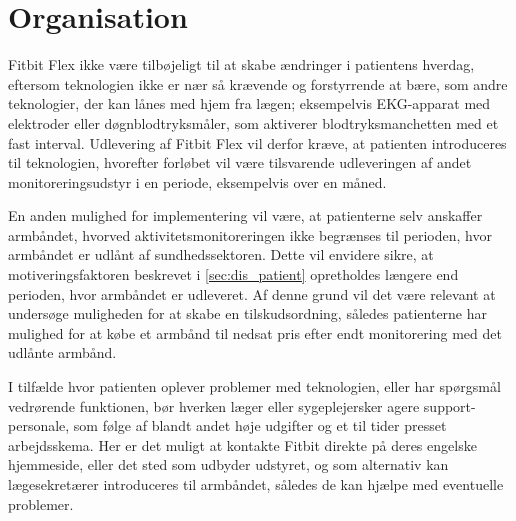 \section{Organisation} \label{sec:dis_organisation}

Fitbit Flex ikke være tilbøjeligt til at skabe ændringer i patientens hverdag, eftersom teknologien ikke er nær så krævende og forstyrrende at bære, som andre teknologier, der kan lånes med hjem fra lægen; eksempelvis EKG-apparat med elektroder eller døgnblodtryksmåler, som aktiverer blodtryksmanchetten med et fast interval. Udlevering af Fitbit Flex vil derfor kræve, at patienten introduceres til teknologien, hvorefter forløbet vil være tilsvarende udleveringen af andet monitoreringsudstyr i en periode, eksempelvis over en måned.

En anden mulighed for implementering vil være, at patienterne selv anskaffer armbåndet, hvorved aktivitetsmonitoreringen ikke begrænses til perioden, hvor armbåndet er udlånt af sundhedssektoren. Dette vil envidere sikre, at motiveringsfaktoren beskrevet i \autoref{sec:dis_patient} opretholdes længere end perioden, hvor armbåndet er udleveret. Af denne grund vil det være relevant at undersøge muligheden for at skabe en tilskudsordning, således patienterne har mulighed for at købe et armbånd til nedsat pris efter endt monitorering med det udlånte armbånd.


I tilfælde hvor patienten oplever problemer med teknologien, eller har spørgsmål vedrørende funktionen, bør hverken læger eller sygeplejersker agere support-personale, som følge af blandt andet høje udgifter og et til tider presset arbejdsskema. Her er det muligt at kontakte Fitbit direkte på deres engelske hjemmeside, eller det sted som udbyder udstyret, og som alternativ kan lægesekretærer introduceres til armbåndet, således de kan hjælpe med eventuelle problemer.

